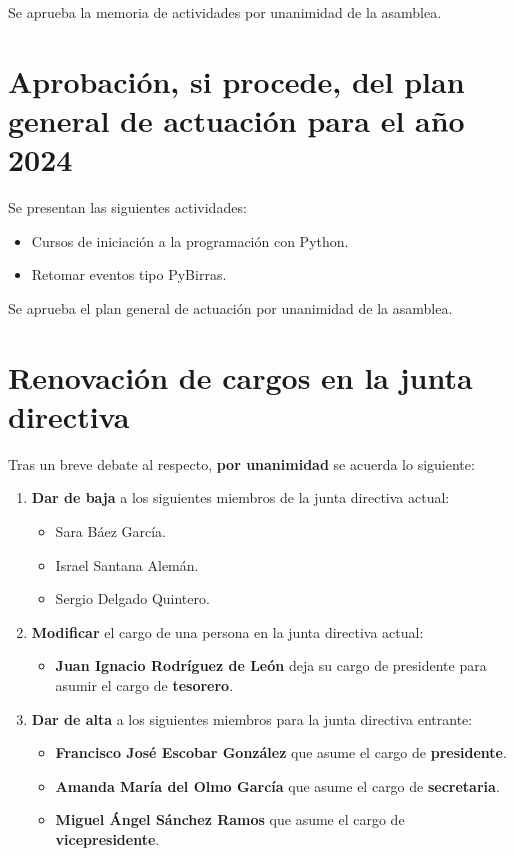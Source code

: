 \documentclass[a4paper,12pt]{article}
\begin{document}
Se aprueba la memoria de actividades por unanimidad de la asamblea.

\section{Aprobación, si procede, del plan general de actuación para el año 2024}

Se presentan las siguientes actividades:

\begin{itemize}
    \item Cursos de iniciación a la programación con Python.
    \item Retomar eventos tipo PyBirras.
\end{itemize}

Se aprueba el plan general de actuación por unanimidad de la asamblea.\\

\section{Renovación de cargos en la junta directiva}

Tras un breve debate al respecto, \textbf{por unanimidad} se acuerda lo siguiente:

\begin{enumerate}
    \item \textbf{Dar de baja} a los siguientes miembros de la junta directiva actual:
    \begin{itemize}
        \item Sara Báez García.
        \item Israel Santana Alemán.
        \item Sergio Delgado Quintero.
    \end{itemize}
    \item \textbf{Modificar} el cargo de una persona en la junta directiva actual:
    \begin{itemize}
        \item \textbf{Juan Ignacio Rodríguez de León} deja su cargo de presidente para asumir el cargo de \textbf{tesorero}.
    \end{itemize}
    \item \textbf{Dar de alta} a los siguientes miembros para la junta directiva entrante:
    \begin{itemize}
        \item \textbf{Francisco José Escobar González} que asume el cargo de \textbf{presidente}.
        \item \textbf{Amanda María del Olmo García} que asume el cargo de \textbf{secretaria}.
        \item \textbf{Miguel Ángel Sánchez Ramos} que asume el cargo de \textbf{vicepresidente}.
    \end{itemize}
\end{enumerate}
\end{document}
